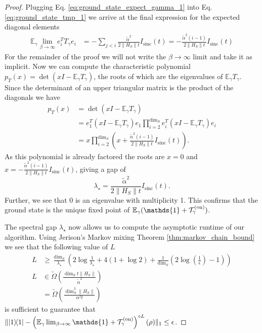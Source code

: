 \documentclass{article}
\newcommand{\on}{\rm on}
\newcommand{\ketbra}[2]{| #1\rangle\! \langle #2|}
\newcommand{\norm}[1]{\| #1 \|}
\newcommand{\EE}{\mathbb{E}}
\newcommand{\TT}{\mathcal{T}}
\newcommand{\identity}{\mathds{1}}
\DeclareMathOperator{\sinc}{sinc}
\begin{document}
\begin{proof}
Plugging Eq. \eqref{eq:ground_state_expect_gamma_1} into Eq. \eqref{eq:ground_state_tmp_1} we arrive at the final expression for the expected diagonal elements
\begin{align}
    \EE_\gamma \lim_{\beta \to \infty} e_i^T T_\gamma e_i &= -   \sum_{j < i}  \frac{\widetilde{\alpha}^2}{2 \norm{H_S} t} I_{\sinc}(t) = - \frac{\widetilde{\alpha}^2 (i - 1)}{2 \norm{H_S} t} I_{\sinc}(t)
\end{align}
For the remainder of the proof we will not write the $\beta \to \infty$ limit and take it as implicit. Now we can compute the characteristic polynomial $p_T(x) = \det(x I - \EE_\gamma T_\gamma)$, the roots of which are the eigenvalues of $\EE_\gamma T_\gamma$. Since the determinant of an upper triangular matrix is the product of the diagonals we have
\begin{align}
    p_T(x) &= \det(x I - \EE_\gamma T_\gamma) \\
    &= e_1^T(x I - \EE_\gamma T_\gamma)e_1 \prod_{i = 2}^{\dim_S} e_i^T (x I - \EE_\gamma T_\gamma) e_i \\
    &= x \prod_{i = 2}^{\dim_S} \left( x + \frac{\widetilde{\alpha}^2 (i - 1)}{2 \norm{H_S} t} I_{\sinc}(t)\right). \label{eq:ground_state_characteristic_poly}
\end{align}
As this polynomial is already factored the roots are $x = 0$ and $x = - \frac{\widetilde{\alpha}^2 (i - 1)}{2 \norm{H_S} t} I_{\sinc}(t)$, giving a gap of 
\begin{equation}
    \lambda_\star = \frac{\widetilde{\alpha}^2}{2 \norm{H_S} t} I_{\sinc}(t). \label{eq:ground_state_spectral_gap}
\end{equation}
Further, we see that 0 is an eigenvalue with multiplicity 1. This confirms that the ground state is the unique fixed point of $\EE_\gamma (\identity + \TT_\gamma^{(\on)})$.

The spectral gap $\lambda_\star$ now allows us to compute the asymptotic runtime of our algorithm. Using Jerison's Markov mixing Theorem \ref{thm:markov_chain_bound} we see that the following value of $L$
\begin{align}
    L &\ge \frac{\dim_S}{\lambda_\star} \left( 2\log \frac{1}{\lambda_{\star}} + 4(1 + \log 2)+ \frac{1}{\dim_S} (2 \log \left( \frac{1}{\epsilon} \right) - 1)\right) \\
    L &\in \widetilde{\Omega} \left( \frac{\dim_S t \norm{H_S}}{\widetilde{\alpha}^2 } \right) \\
    &= \widetilde{\Omega} \left( \frac{\dim_S^2 \norm{H_S}}{\alpha^2 t }\right)
\end{align}
is sufficient to guarantee that $\norm{\ketbra{1}{1} - \left(\EE_\gamma \lim_{\beta \to \infty} \identity + \TT_\gamma^{(\on)}\right)^{\circ L}(\rho)}_1 \le \epsilon$.



\end{proof}
\end{document}
